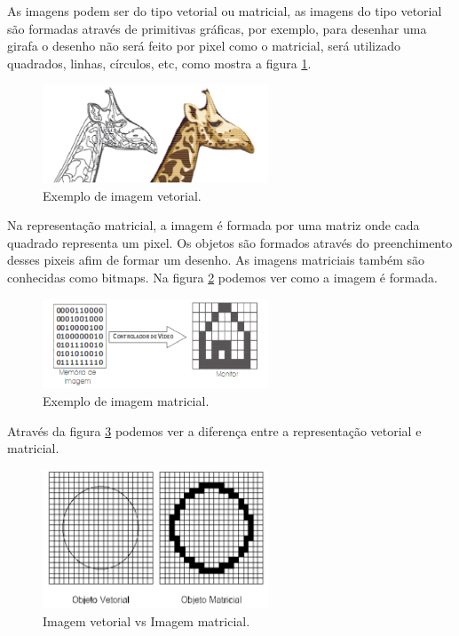 \documentclass{article}
\begin{document}
    As imagens podem ser do tipo vetorial ou matricial, as imagens do tipo vetorial são formadas através de primitivas gráficas, por exemplo, para desenhar uma girafa o desenho não será feito por pixel como o matricial, será utilizado quadrados, linhas, círculos, etc, como mostra a figura \ref{fig:fig2}.
    
     \begin{figure}[H]
        \centering
        \includegraphics[width=0.6\textwidth]{template/img/fig2.png}
        \caption{Exemplo de imagem vetorial.}
        \label{fig:fig2}
    \end{figure}
    
    Na representação matricial, a imagem é formada por uma matriz onde cada quadrado representa um pixel. Os objetos são formados através do preenchimento desses pixeis afim de formar um desenho. As imagens matriciais também são conhecidas como bitmaps. Na figura \ref{fig:fig3} podemos ver como a imagem é formada.
    
    \begin{figure}[H]
        \centering
        \includegraphics[width=0.6\textwidth]{template/img/fig3.png}
        \caption{Exemplo de imagem matricial.}
        \label{fig:fig3}
    \end{figure}
    
    Através da figura \ref{fig:fig4} podemos ver a diferença entre a representação vetorial e matricial.
    
    \begin{figure}[H]
        \centering
        \includegraphics[width=0.6\textwidth]{template/img/fig4.png}
        \caption{Imagem vetorial vs Imagem matricial.}
        \label{fig:fig4}
    \end{figure}
    
\end{document}
